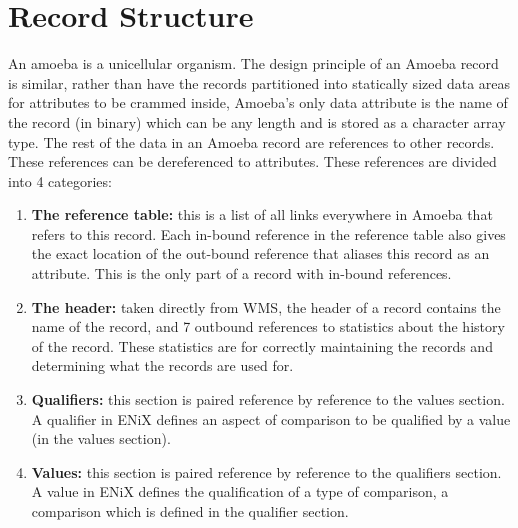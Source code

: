 \documentclass[11pt]{article}
\begin{document}
\section{Record Structure}
An amoeba is a unicellular organism. The design principle of an Amoeba record is similar, rather than have the records partitioned into statically sized data areas for attributes to be crammed inside, Amoeba's only data attribute is the name of the record (in binary) which can be any length and is stored as a character array type. The rest of the data in an Amoeba record are references to other records. These references can be dereferenced to attributes. 
\newline
\newline
These references are divided into 4 categories:
\begin{enumerate}
\item \textbf{The reference table:} this is a list of all links everywhere in Amoeba that refers to this record. Each in-bound reference in the reference table also gives the exact location of the out-bound reference that aliases this record as an attribute. This is the only part of a record with in-bound references.
\item \textbf{The header:} taken directly from WMS, the header of a record contains the name of the record, and 7 outbound references to statistics about the history of the record. These statistics are for correctly maintaining the records and determining what the records are used for. 
\item \textbf{Qualifiers:} this section is paired reference by reference to the values section. A qualifier in ENiX defines an aspect of comparison to be qualified by a value (in the values section).
\item \textbf{Values:} this section is paired reference by reference to the qualifiers section. A value in ENiX defines the qualification of a type of comparison, a comparison which is defined in the qualifier section.
\end{enumerate}
\end{document}
